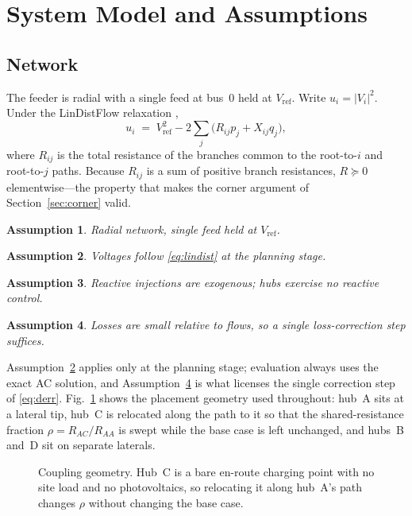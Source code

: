 \documentclass[lettersize,journal]{IEEEtran}
\newtheorem{assumption}{Assumption}
\begin{document}
\section{System Model and Assumptions}\label{sec:model}

\subsection{Network}
The feeder is radial with a single feed at bus~0 held at $V_{\mathrm{ref}}$.
Write $u_i=|V_i|^{2}$. Under the LinDistFlow relaxation
\cite{baran1989reconfig},
\begin{equation}\label{eq:lindist}
u_i \;=\; V_{\mathrm{ref}}^{2}-2\sum_{j}\bigl(R_{ij}p_j+X_{ij}q_j\bigr),
\end{equation}
where $R_{ij}$ is the total resistance of the branches common to the
root-to-$i$ and root-to-$j$ paths. Because $R_{ij}$ is a sum of positive branch
resistances, $R\succeq 0$ elementwise---the property that makes the corner
argument of Section~\ref{sec:corner} valid.

\begin{assumption}\label{as:radial}
Radial network, single feed held at $V_{\mathrm{ref}}$.
\end{assumption}
\begin{assumption}\label{as:lin}
Voltages follow \eqref{eq:lindist} at the planning stage.
\end{assumption}
\begin{assumption}\label{as:q}
Reactive injections are exogenous; hubs exercise no reactive control.
\end{assumption}
\begin{assumption}\label{as:loss}
Losses are small relative to flows, so a single loss-correction step suffices.
\end{assumption}

Assumption~\ref{as:lin} applies only at the planning stage; evaluation always
uses the exact AC solution, and Assumption~\ref{as:loss} is what licenses the
single correction step of \eqref{eq:derr}.
Fig.~\ref{fig:topology} shows the placement geometry used throughout: hub~A
sits at a lateral tip, hub~C is relocated along the path to it so that the
shared-resistance fraction $\rho=R_{AC}/R_{AA}$ is swept while the base case is
left unchanged, and hubs~B and~D sit on separate laterals.

\begin{figure}[!t]\centering
\resizebox{\columnwidth}{!}{}
\caption{Coupling geometry. Hub~C is a bare en-route charging point with no site
load and no photovoltaics, so relocating it along hub~A's path changes $\rho$
without changing the base case.}
\label{fig:topology}
\end{figure}
\end{document}
